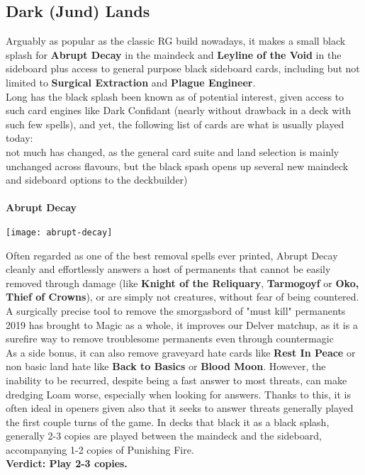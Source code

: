 \documentclass{report}
\begin{document}
\subsection{Dark (Jund) Lands}
Arguably as popular as the classic RG build nowadays, it makes a small black splash for \textbf{Abrupt Decay} in the maindeck and \textbf{Leyline of the Void} in the sideboard plus access to general purpose black sideboard cards, including but not limited to \textbf{Surgical Extraction} and \textbf{Plague Engineer}.\\
Long has the black splash been known as of potential interest, given access to such card engines like Dark Confidant (nearly without drawback in a deck with such few spells), and yet, the following list of cards are what is usually played today:\\
not much has changed, as the general card suite and land selection is mainly unchanged across flavours, but the black spash opens up several new maindeck and sideboard options to the deckbuilder)\\\\
\textbf{Abrupt Decay\\}
\begin{center}
\texttt{[image: abrupt-decay]}
\end{center}
Often regarded as one of the best removal spells ever printed, Abrupt Decay cleanly and effortlessly answers a host of permanents that cannot be easily removed through damage (like \textbf{Knight of the Reliquary}, \textbf{Tarmogoyf} or \textbf{Oko, Thief of Crowns}), or are simply not creatures, without fear of being countered. A surgically precise tool to remove the smorgasbord of "must kill" permanents 2019 has brought to Magic as a whole, it improves our Delver matchup, as it is a surefire way to remove troublesome permanents even through countermagic\\ As a side bonus, it can also remove graveyard hate cards like \textbf{Rest In Peace} or non basic land hate like \textbf{Back to Basics} or \textbf{Blood Moon}. However, the inability to be recurred, despite being a fast answer to most threats, can make dredging Loam worse, especially when looking for answers. Thanks to this, it is often ideal in openers given also that it seeks to answer threats generally played the first couple turns of the game. In decks that black it as a black splash, generally 2-3 copies are played between the maindeck and the sideboard, accompanying 1-2 copies of Punishing Fire.\\
\textbf{Verdict: Play 2-3 copies.\\\\}
\end{document}

